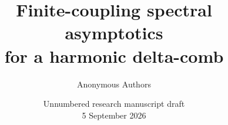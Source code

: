 \documentclass[11pt,a4paper]{article}
\title{Finite-coupling spectral asymptotics\\for a harmonic delta-comb}
\author{Anonymous Authors}
\date{Unnumbered research manuscript draft\\5 September 2026}
\begin{document}
\maketitle
\begin{abstract}

\end{abstract}









\end{document}

